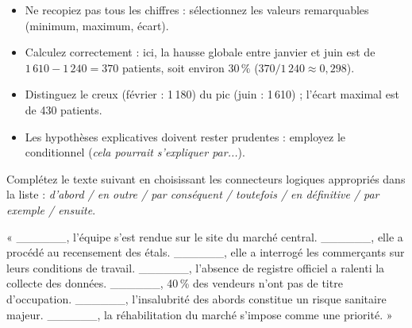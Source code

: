 \documentclass[11pt]{article}
\begin{document}
\begin{attention}
\begin{itemize}
    \item Ne recopiez pas tous les chiffres : sélectionnez les valeurs remarquables (minimum, maximum, écart).
    \item Calculez correctement : ici, la hausse globale entre janvier et juin est de $1\,610 - 1\,240 = 370$ patients, soit environ $30\,\%$ ($370/1\,240 \approx 0{,}298$).
    \item Distinguez le creux (février : 1\,180) du pic (juin : 1\,610) ; l'écart maximal est de 430 patients.
    \item Les hypothèses explicatives doivent rester prudentes : employez le conditionnel (\emph{cela pourrait s'expliquer par...}).
\end{itemize}
\end{attention}

\begin{exercice}
Complétez le texte suivant en choisissant les connecteurs logiques appropriés dans la liste : \emph{d'abord / en outre / par conséquent / toutefois / en définitive / par exemple / ensuite}.

« \_\_\_\_\_\_, l'équipe s'est rendue sur le site du marché central. \_\_\_\_\_\_, elle a procédé au recensement des étals. \_\_\_\_\_\_, elle a interrogé les commerçants sur leurs conditions de travail. \_\_\_\_\_\_, l'absence de registre officiel a ralenti la collecte des données. \_\_\_\_\_\_, 40\,\% des vendeurs n'ont pas de titre d'occupation. \_\_\_\_\_\_, l'insalubrité des abords constitue un risque sanitaire majeur. \_\_\_\_\_\_, la réhabilitation du marché s'impose comme une priorité. »
\end{exercice}
\end{document}
